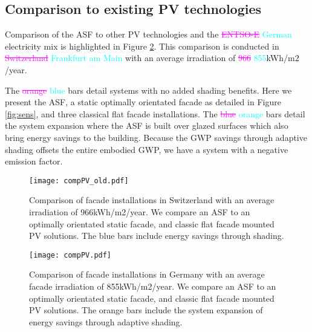 \subsection{Comparison to existing PV technologies}

Comparison of the ASF to other PV technologies and the \textcolor{magenta}{\sout{ENTSO-E}} \textcolor{cyan}{German} electricity mix is highlighted in Figure \ref{fig:compPV}. This comparison is conducted in \textcolor{magenta}{\sout{Switzerland}} \textcolor{cyan}{Frankfurt am Main} with an average irradiation of \textcolor{magenta}{\sout{966}} \textcolor{cyan}{855}kWh/m$2$/year.\

The \textcolor{magenta}{\sout{orange}} \textcolor{cyan}{blue} bars detail systems with no added shading benefits. Here we present the ASF, a static optimally orientated facade as detailed in Figure \ref{fig:sens}, and three classical flat facade installations.  
The \textcolor{magenta}{\sout{blue}} \textcolor{cyan}{orange} bars detail the system expansion where the ASF is built over glazed surfaces which also bring energy savings to the building. Because the GWP savings through adaptive shading offsets the entire embodied GWP, we have a system with a negative emission factor.




\begin{figure}[H]
\begin{center}
\begin{mdframed}[linecolor=magenta, linewidth=2pt]
\texttt{[image: compPV\_old.pdf]}
\caption{Comparison of facade installations in Switzerland with an average irradiation of 966kWh/m2/year.
We compare an ASF to an optimally orientated static facade, and classic flat facade mounted PV solutions. The blue bars include energy savings through shading.}
\label{fig:compPV_old}
\end{mdframed}
\end{center}
\end{figure}

\begin{figure}[H]
\begin{center}
\begin{mdframed}[linecolor=cyan, linewidth=2pt]
\texttt{[image: compPV.pdf]}
\caption{Comparison of facade installations in Germany with an average facade irradiation of 855kWh/m2/year.
We compare an ASF to an optimally orientated static facade, and classic flat facade mounted PV solutions. The orange bars include the system expansion of energy savings through adaptive shading.}
\label{fig:compPV}
\end{mdframed}
\end{center}
\end{figure}

